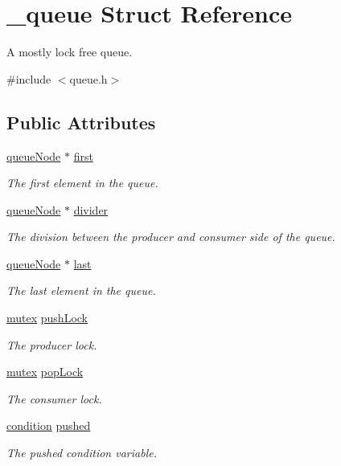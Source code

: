 \hypertarget{struct__queue}{}\section{\+\_\+queue Struct Reference}
\label{struct__queue}


A mostly lock free queue.  




{\ttfamily \#include $<$queue.\+h$>$}

\subsection*{Public Attributes}
\begin{DoxyCompactItemize}
\item 
\hyperlink{queue_8h_ae1857eedcea35e26ec2c78b7b122b095}{queue\+Node} $\ast$ \hyperlink{struct__queue_a3720f64e698aa40d96ee20e8751c41fb}{first}
\begin{DoxyCompactList}\small\item\em The first element in the queue. \end{DoxyCompactList}\item 
\hyperlink{queue_8h_ae1857eedcea35e26ec2c78b7b122b095}{queue\+Node} $\ast$ \hyperlink{struct__queue_a4def97dd0c360cb833228b57dada20dc}{divider}
\begin{DoxyCompactList}\small\item\em The division between the producer and consumer side of the queue. \end{DoxyCompactList}\item 
\hyperlink{queue_8h_ae1857eedcea35e26ec2c78b7b122b095}{queue\+Node} $\ast$ \hyperlink{struct__queue_a29b95a909fa3663c0ac1d3d5d60f46cc}{last}
\begin{DoxyCompactList}\small\item\em The last element in the queue. \end{DoxyCompactList}\item 
\hyperlink{queue_8h_a8c80af1d72030a9dc70c3a2c3e46ae9a}{mutex} \hyperlink{struct__queue_ae3358baa9df4a511359bbd0c318177e0}{push\+Lock}
\begin{DoxyCompactList}\small\item\em The producer lock. \end{DoxyCompactList}\item 
\hyperlink{queue_8h_a8c80af1d72030a9dc70c3a2c3e46ae9a}{mutex} \hyperlink{struct__queue_ad365cfb038935edc4496f6e5df7f8ee8}{pop\+Lock}
\begin{DoxyCompactList}\small\item\em The consumer lock. \end{DoxyCompactList}\item 
\hyperlink{queue_8h_a18a0de1af5a8524b75bf94d6b14701b4}{condition} \hyperlink{struct__queue_a1b938cb0b6d5e37e6b8e3715d5bd5c4a}{pushed}
\begin{DoxyCompactList}\small\item\em The pushed condition variable. \end{DoxyCompactList}\end{DoxyCompactItemize}


